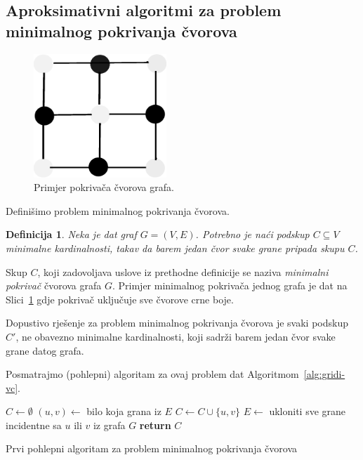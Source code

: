 \documentclass[b5paper, utf8, 11pt, colorlinks]{book}
\newtheorem{definition}{Definicija}[chapter]
\theoremstyle{definition}
\begin{document}
  \subsection{Aproksimativni algoritmi za problem  minimalnog pokrivanja čvorova}\label{sec:aprokspokrivanjecvorova}
  
    \begin{figure}
  	\centering
  	\includegraphics[width=50mm]{vertex-cover.eps}

  	\caption{Primjer pokrivača čvorova grafa.}   	\label{fig:vertex-cover}
  \end{figure}
Definišimo problem minimalnog pokrivanja čvorova.

\begin{definition}
  Neka je dat graf $G=(V,E)$. Potrebno je naći podskup $C\subseteq V$ minimalne kardinalnosti, takav da barem jedan čvor svake grane pripada skupu $C$. 
\end{definition}  
 Skup $C$, koji zadovoljava uslove iz prethodne definicije se naziva \emph{minimalni pokrivač} čvorova grafa $G$. Primjer minimalnog pokrivača jednog grafa je dat na Slici~\ref{fig:vertex-cover} gdje pokrivač uključuje sve čvorove crne boje. 

   Dopustivo rješenje za problem minimalnog pokrivanja čvorova je svaki podskup $C'$, ne obavezno minimalne kardinalnosti, koji sadrži barem jedan čvor svake grane datog grafa.
  
  Posmatrajmo (pohlepni) algoritam za ovaj problem dat Algoritmom~\ref{alg:gridi-vc}. 
  
  \begin{algorithm}[H] 
  	\begin{algorithmic}[1]
  		\STATE $C \gets \emptyset$
  		\STATE $(u,v)\gets$ bilo koja grana iz $E$
  		\STATE $C \gets C \cup \{u,v\}$
  		\STATE $E \gets $ ukloniti sve grane incidentne sa  $u$ ili $v$ iz grafa $G$
  		\ENDWHILE
  		\STATE \textbf{return} $C$
  	\end{algorithmic}   
   
     \caption{Prvi pohlepni algoritam za problem minimalnog pokrivanja čvorova}
 \label{alg:gridi-vc}
  \end{algorithm}
  
\end{document}
